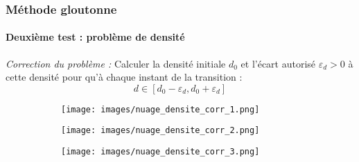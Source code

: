 \documentclass{beamer}
\begin{document}
\begin{frame}
	\frametitle{Méthode gloutonne}
	\framesubtitle{Deuxième test : problème de densité}
	\emph{Correction du problème :} Calculer la densité initiale $d_0$ et l'écart autorisé $\varepsilon_d > 0$ à cette densité  pour qu'à chaque instant de la transition : \[d \in [d_0 - \varepsilon_d , d_0 + \varepsilon_d] \]
	\begin{figure}[!htb]
			\centering 
			\begin{subfigure}{0.25\textwidth}
				\centering 
				\texttt{[image: images/nuage\_densite\_corr\_1.png]}
			\end{subfigure}
			\hspace*{\fill}
			\begin{subfigure}{0.25\textwidth}
				\centering 
				\texttt{[image: images/nuage\_densite\_corr\_2.png]}
			\end{subfigure}
			\hspace*{\fill}
			\begin{subfigure}{0.25\textwidth}
				\centering 
				\texttt{[image: images/nuage\_densite\_corr\_3.png]}
			\end{subfigure}
			\hspace*{\fill}
			
		\end{figure}
\end{frame}
\end{document}
